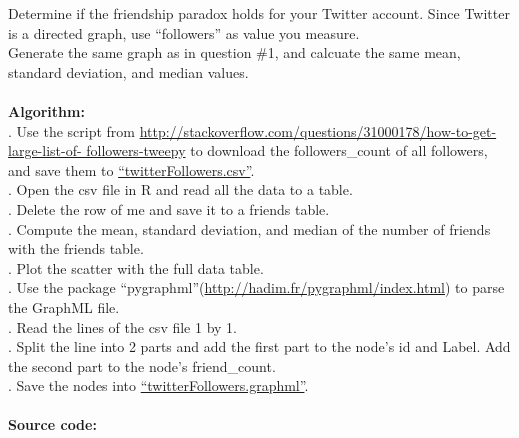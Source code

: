\documentclass{article}
\begin{document}
		\indent Determine if the friendship paradox holds for your Twitter account. Since Twitter is a directed graph, use ``followers'' as value you measure.\\
		\indent Generate the same graph as in question \#1, and calcuate the same mean, standard deviation, and median values.\\\\
		\textbf{Algorithm:}\\
		. Use the script from \url{http://stackoverflow.com/questions/31000178/how-to-get-large-list-of-
followers-tweepy} to download the followers\_count of all followers, and save them to \href{https://github.com/zhangboroy/cs532-s17/blob/master/assg04_submission/twitterFollowers.csv}{``twitterFollowers.csv''}.\\
		. Open the csv file in R and read all the data to a table.\\
		. Delete the row of me and save it to a friends table.\\
		. Compute the mean, standard deviation, and median of the number of friends with the friends table.\\
		. Plot the scatter with the full data table.\\
		. Use the package ``pygraphml''(\url{http://hadim.fr/pygraphml/index.html}) to parse the GraphML file.\\
		. Read the lines of the csv file 1 by 1.\\
		. Split the line into 2 parts and add the first part to the node's id and Label. Add the second part to the node's friend\_count.\\
		. Save the nodes into \href{https://github.com/zhangboroy/cs532-s17/blob/master/assg04_submission/twitterFollowers.graphml}{``twitterFollowers.graphml''}.\\\\
		\textbf{Source code:}
		
		
		
\end{document}
